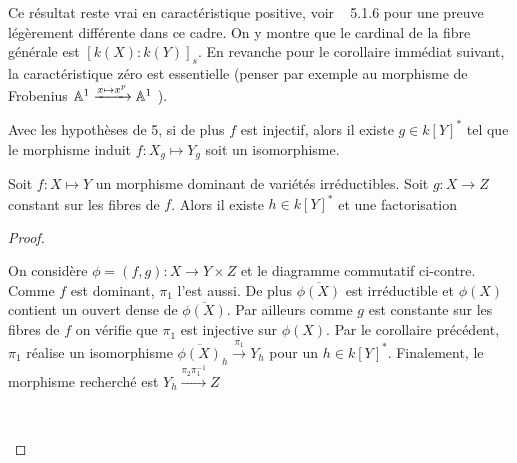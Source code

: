 Ce résultat reste vrai en caractéristique positive, voir 
~\cite{LAGSpringer} 5.1.6 pour une preuve légèrement différente dans ce cadre. On y montre que le cardinal de la fibre générale est $[k(X):k(Y)]_s$. En revanche pour le corollaire immédiat suivant, la caractéristique zéro est essentielle (penser par exemple au morphisme de Frobenius $\mathbb{A}^1 \xrightarrow{x \mapsto x^p} \mathbb{A}^1$ ). 
\begin{cor}
Avec les hypothèses de 5, si de plus $f$ est injectif, alors il existe $g\in k[Y]^*$ tel que le morphisme induit $f:X_g \mapsto Y_g$ soit un isomorphisme.
\end{cor}

\begin{prop}\label{facto}
Soit $f:X \mapsto Y$ un morphisme dominant de variétés irréductibles. Soit $g:X \rightarrow Z$ constant sur les fibres de $f$. Alors il existe $h\in k[Y]^*$ et une factorisation
\end{prop}
\begin{proof}
	\begin{multicols}{2}
	On considère $\phi=(f,g):X\rightarrow Y\times Z$ et le diagramme commutatif ci-contre. Comme $f$ est dominant, $\pi_1$ l'est aussi. De plus $\overline{\phi(X)}$ est irréductible et $\phi(X)$ contient un ouvert dense de $\overline{\phi(X)}$. Par ailleurs comme $g$ est constante sur les fibres de $f$ on vérifie que $\pi_1$ est injective sur $\phi(X)$. Par le corollaire précédent, $\pi_1$ réalise un isomorphisme $\overline{\phi(X)}_h \xrightarrow{\pi_1} Y_h$ pour un $h\in k[Y]^*$. Finalement, le morphisme recherché est  $Y_h \xrightarrow{\pi_2\pi_1^{-1}} Z$ 
	
	\columnbreak
	\begin{center}
	\\
	\end{center}
	\end{multicols}
\end{proof}

